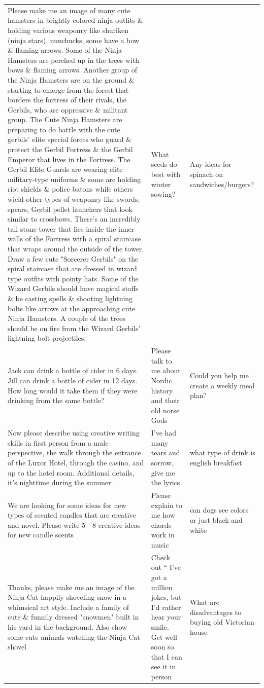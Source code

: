 \begin{table}[ht]
\begin{tabular}{p{4.3cm}p{4.3cm}p{4.3cm}}
Please make me an image of many cute hamsters in brightly colored ninja outfits \& holding various weaponry like shuriken (ninja stars), nunchucks, some have a bow \& flaming arrows. Some of the Ninja Hamsters are perched up in the trees with bows \& flaming arrows. Another group of the Ninja Hamsters are on the ground \& starting to emerge from the forest that borders the fortress of their rivals, the Gerbils, who are oppressive \& militant group. The Cute Ninja Hamsters are preparing to do battle with the cute gerbils' elite special forces who guard \& protect the Gerbil Fortress \& the Gerbil Emperor that lives in the Fortress. The Gerbil Elite Guards are wearing elite military-type uniforms \& some are holding riot shields \& police batons while others wield other types of weaponry like swords, spears, Gerbil pellet launchers that look similar to crossbows. There's an incredibly tall stone tower that lies inside the inner walls of the Fortress with a spiral staircase that wraps around the outside of the tower. Draw a few cute "Sorcerer Gerbils" on the spiral staircase that are dressed in wizard type outfits with pointy hats. Some of the Wizard Gerbils should have magical staffs \& be casting spells \& shooting lightning bolts like arrows at the approaching cute Ninja Hamsters. A couple of the trees should be on fire from the Wizard Gerbils' lightning bolt projectiles. & What seeds do best with winter sowing? & Any ideas for spinach on sandwiches/burgers? \\[4pt]
Jack can drink a bottle of cider in 6 days. Jill can drink a bottle of cider in 12 days. How long would it take them if they were drinking from the same bottle? & Please talk to me about  Nordic history and their old norse Gods & Could you help me create a weekly meal plan? \\[4pt]
Now please describe using creative writing skills in first person from a male perspective, the walk through the entrance of the Luxor Hotel, through the casino, and up to the hotel room.   Additional details, it's nighttime during the summer. & I've had many tears and sorrow, give me the lyrics & what type of drink is english breakfast \\[4pt]
We are looking for some ideas for new types of scented candles that are creative and novel. Please write 5 - 8 creative ideas for new candle scents & Please explain to me how chords work in music & can dogs see colors or just black and white \\[4pt]
Thanks, please make me an image of the Ninja Cat happily shoveling snow in a whimsical art style. Include a family of cute \& funnily dressed "snowmen" built in his yard in the background. Also show some cute animals watching the Ninja Cat shovel & Check out “ I’ve got a million jokes, but I’d rather hear your smile. Get well soon so that I can see it in person & What are disadvantages to buying old Victorian house \\[4pt]

\end{tabular}
\end{table}
